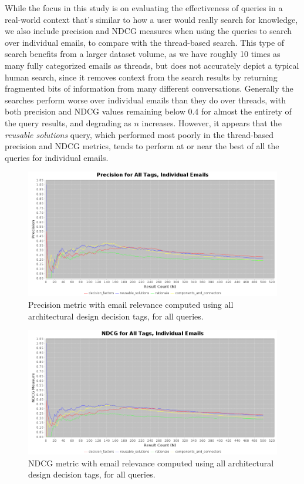 \documentclass[a4paper, 12pt]{article}
\begin{document}
		While the focus in this study is on evaluating the effectiveness of queries in a real-world context that's similar to how a user would really search for knowledge, we also include precision and NDCG measures when using the queries to search over individual emails, to compare with the thread-based search. This type of search benefits from a larger dataset volume, as we have roughly 10 times as many fully categorized emails as threads, but does not accurately depict a typical human search, since it removes context from the search results by returning fragmented bits of information from many different conversations. Generally the searches perform worse over individual emails than they do over threads, with both precision and NDCG values remaining below $ 0.4 $ for almost the entirety of the query results, and degrading as $ n $ increases. However, it appears that the \textit{reusable solutions} query, which performed most poorly in the thread-based precision and NDCG metrics, tends to perform at or near the best of all the queries for individual emails.
		
		\begin{figure}
			\centering
			\includegraphics[width=\textwidth]{report/precision/precision_all_emails.png}
			\caption{Precision metric with email relevance computed using all architectural design decision tags, for all queries.}
			\label{fig:precisionemailall}
		\end{figure}
		
		\begin{figure}
			\centering
			\includegraphics[width=\textwidth]{report/precision/ndcg_all_emails.png}
			\caption{NDCG metric with email relevance computed using all architectural design decision tags, for all queries.}
			\label{fig:ndcgemailall}
		\end{figure}
\end{document}
